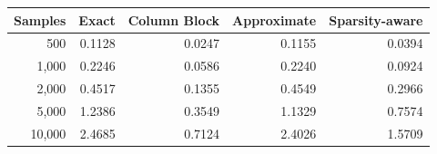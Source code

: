 \begin{tabular}{rrrrr}
\toprule
\textbf{Samples} & \textbf{Exact} & \textbf{Column Block} & \textbf{Approximate} & \textbf{Sparsity-aware} \\
\midrule
500 & 0.1128 & 0.0247 & 0.1155 & 0.0394 \\
1,000 & 0.2246 & 0.0586 & 0.2240 & 0.0924 \\
2,000 & 0.4517 & 0.1355 & 0.4549 & 0.2966 \\
5,000 & 1.2386 & 0.3549 & 1.1329 & 0.7574 \\
10,000 & 2.4685 & 0.7124 & 2.4026 & 1.5709 \\
\bottomrule
\end{tabular}

